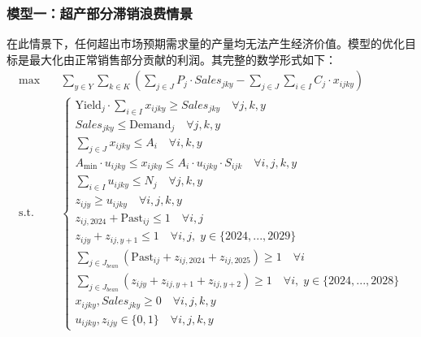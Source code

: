 \subsubsection{模型一：超产部分滞销浪费情景}
在此情景下，任何超出市场预期需求量的产量均无法产生经济价值。模型的优化目标是最大化由正常销售部分贡献的利润。其完整的数学形式如下：
\begin{align}
\max \quad & \sum_{y \in Y} \sum_{k \in K} \left( \sum_{j \in J} P_j \cdot Sales_{jky} - \sum_{j \in J} \sum_{i \in I} C_j \cdot x_{ijky} \right) \\
\text{s.t.} \quad & \left\{
    \begin{array}{l}
        \text{Yield}_j \cdot \sum_{i \in I} x_{ijky} \ge Sales_{jky} \quad \forall j,k,y                                  \\
        Sales_{jky} \le \text{Demand}_j \quad \forall j,k,y                                                          \\
        \sum_{j \in J} x_{ijky} \le A_i \quad \forall i,k,y                                                          \\
        A_{\min} \cdot u_{ijky} \le x_{ijky} \le A_i \cdot u_{ijky} \cdot S_{ijk} \quad \forall i,j,k,y                \\
        \sum_{i \in I} u_{ijky} \le N_j \quad \forall j,k,y                                                          \\
        z_{ijy} \ge u_{ijky} \quad \forall i,j,k,y                                                                   \\
        z_{ij,2024} + \text{Past}_{ij} \le 1 \quad \forall i,j                                                       \\
        z_{ijy} + z_{ij,y+1} \le 1 \quad \forall i,j, \; y \in \{2024,...,2029\}                                      \\
        \sum_{j \in J_{bean}} (\text{Past}_{ij} + z_{ij,2024} + z_{ij,2025}) \ge 1 \quad \forall i                     \\
        \sum_{j \in J_{bean}} (z_{ijy} + z_{ij,y+1} + z_{ij,y+2}) \ge 1 \quad \forall i, \; y \in \{2024,...,2028\}    \\
        x_{ijky}, Sales_{jky} \ge 0 \quad \forall i,j,k,y                                                            \\
        u_{ijky}, z_{ijy} \in \{0, 1\} \quad \forall i,j,k,y
    \end{array}
    \right.
\end{align}

